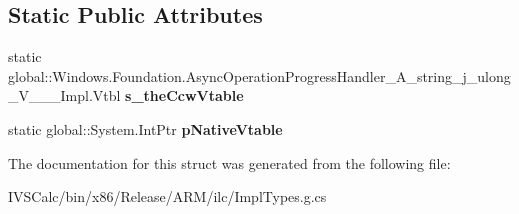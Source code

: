 \subsection*{Static Public Attributes}
\begin{DoxyCompactItemize}
\item 
\mbox{\label{struct_windows_1_1_foundation_1_1_async_operation_progress_handler___a__string__j__ulong___v_______impl_1_1_vtbl_ace4b94b1236a46c202a33b2242ef4bc6}} 
static global\+::\+Windows.\+Foundation.\+Async\+Operation\+Progress\+Handler\+\_\+\+A\+\_\+string\+\_\+j\+\_\+ulong\+\_\+\+V\+\_\+\+\_\+\+\_\+\+Impl.\+Vtbl {\bfseries s\+\_\+the\+Ccw\+Vtable}
\item 
\mbox{\label{struct_windows_1_1_foundation_1_1_async_operation_progress_handler___a__string__j__ulong___v_______impl_1_1_vtbl_a9f4022e83433f3e2971d5649ef92e82e}} 
static global\+::\+System.\+Int\+Ptr {\bfseries p\+Native\+Vtable}
\end{DoxyCompactItemize}


The documentation for this struct was generated from the following file\+:\begin{DoxyCompactItemize}
\item 
I\+V\+S\+Calc/bin/x86/\+Release/\+A\+R\+M/ilc/Impl\+Types.\+g.\+cs\end{DoxyCompactItemize}
